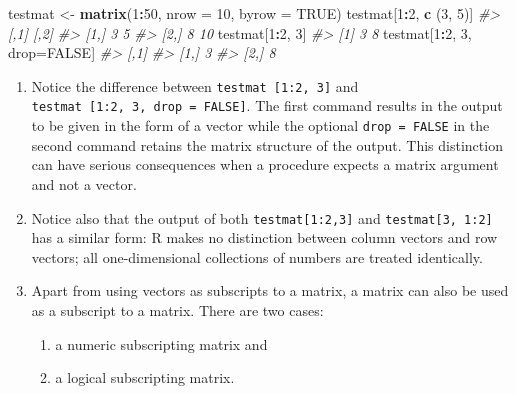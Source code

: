 \documentclass[
]{book}
\newenvironment{Shaded}{\begin{snugshade}}{\end{snugshade}}
\newcommand{\AttributeTok}[1]{\textcolor[rgb]{0.13,0.29,0.53}{#1}}
\newcommand{\CommentTok}[1]{\textcolor[rgb]{0.56,0.35,0.01}{\textit{#1}}}
\newcommand{\ConstantTok}[1]{\textcolor[rgb]{0.56,0.35,0.01}{#1}}
\newcommand{\DecValTok}[1]{\textcolor[rgb]{0.00,0.00,0.81}{#1}}
\newcommand{\FunctionTok}[1]{\textcolor[rgb]{0.13,0.29,0.53}{\textbf{#1}}}
\newcommand{\NormalTok}[1]{#1}
\newcommand{\OtherTok}[1]{\textcolor[rgb]{0.56,0.35,0.01}{#1}}
\newcommand{\SpecialCharTok}[1]{\textcolor[rgb]{0.81,0.36,0.00}{\textbf{#1}}}
\providecommand{\tightlist}{%
  \setlength{\itemsep}{0pt}\setlength{\parskip}{0pt}}
\begin{document}
\begin{Shaded}
\begin{Highlighting}[]
\NormalTok{testmat }\OtherTok{\textless{}{-}} \FunctionTok{matrix}\NormalTok{(}\DecValTok{1}\SpecialCharTok{:}\DecValTok{50}\NormalTok{, }\AttributeTok{nrow =} \DecValTok{10}\NormalTok{, }\AttributeTok{byrow =} \ConstantTok{TRUE}\NormalTok{)}
\NormalTok{testmat[}\DecValTok{1}\SpecialCharTok{:}\DecValTok{2}\NormalTok{, }\FunctionTok{c}\NormalTok{ (}\DecValTok{3}\NormalTok{, }\DecValTok{5}\NormalTok{)]}
\CommentTok{\#\textgreater{}      [,1] [,2]}
\CommentTok{\#\textgreater{} [1,]    3    5}
\CommentTok{\#\textgreater{} [2,]    8   10}
\NormalTok{testmat[}\DecValTok{1}\SpecialCharTok{:}\DecValTok{2}\NormalTok{, }\DecValTok{3}\NormalTok{]}
\CommentTok{\#\textgreater{} [1] 3 8}
\NormalTok{testmat[}\DecValTok{1}\SpecialCharTok{:}\DecValTok{2}\NormalTok{, }\DecValTok{3}\NormalTok{, drop}\OtherTok{=}\ConstantTok{FALSE}\NormalTok{]}
\CommentTok{\#\textgreater{}      [,1]}
\CommentTok{\#\textgreater{} [1,]    3}
\CommentTok{\#\textgreater{} [2,]    8}
\end{Highlighting}
\end{Shaded}

\begin{enumerate}
\def\labelenumi{(\alph{enumi})}
\setcounter{enumi}{7}
\item
  Notice the difference between \texttt{testmat\ {[}1:2,\ 3{]}} and \texttt{testmat\ {[}1:2,\ 3,\ drop\ =\ FALSE{]}}. The first command results in the output to be given in the form of a vector while the optional \texttt{drop\ =\ FALSE} in the second command retains the matrix structure of the output. This distinction can have serious consequences when a procedure expects a matrix argument and not a vector.
\item
  Notice also that the output of both \texttt{testmat{[}1:2,3{]}} and \texttt{testmat{[}3,\ 1:2{]}} has a similar form: R makes no distinction between column vectors and row vectors; all one-dimensional collections of numbers are treated identically.
\item
  Apart from using vectors as subscripts to a matrix, a matrix can also be used as a subscript to a matrix. There are two cases:

  \begin{enumerate}
  \def\labelenumii{(\Alph{enumii})}
  \tightlist
  \item
    a numeric subscripting matrix and
  \item
    a logical subscripting matrix.
  \end{enumerate}
\end{enumerate}
\end{document}
